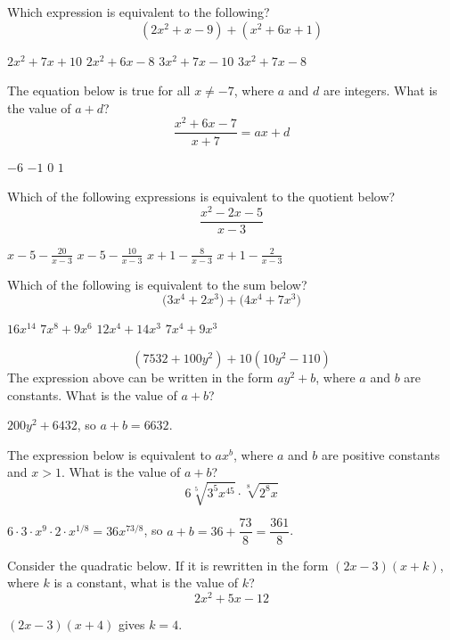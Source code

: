 \question[1]
Which expression is equivalent to the following?
\[
  \left(2 x^{2}+x-9\right)+\left(x^{2}+6 x+1\right)
\]
\begin{choices}
  \choice $2 x^{2}+7 x+10$
  \choice $2 x^{2}+6 x-8$
  \choice $3 x^{2}+7 x-10$
  \CorrectChoice $3 x^{2}+7 x-8$
\end{choices}


\newpage

\question[1]
The equation below is true for all $x \neq-7$, where $a$ and $d$ are integers. What is the value of $a+d$?
\[
  \frac{x^{2}+6 x-7}{x+7}=a x+d
\]
\begin{choices}
  \choice $-6$
  \choice $-1$
  \CorrectChoice $0$
  \choice $1$
\end{choices}

\question[1]
Which of the following expressions is equivalent to the quotient below?
\[
  \frac{x^{2}-2 x-5}{x-3}
\]
\begin{choices}
  \choice $\displaystyle x-5-\frac{20}{x-3}$
  \choice $\displaystyle x-5-\frac{10}{x-3}$
  \CorrectChoice $\displaystyle x+1-\frac{8}{x-3}$
  \choice $\displaystyle x+1-\frac{2}{x-3}$
\end{choices}

\question[1]
Which of the following is equivalent to the sum below?
\[
  \bigl(3 x^{4}+2 x^{3}\bigr)+\bigl(4 x^{4}+7 x^{3}\bigr)
\]
\begin{choices}
  \choice $16 x^{14}$
  \choice $7 x^{8}+9 x^{6}$
  \choice $12 x^{4}+14 x^{3}$
  \CorrectChoice $7 x^{4}+9 x^{3}$
\end{choices}

\newpage


\question[1]
\[
  \left(7532+100 y^{2}\right)+10\left(10 y^{2}-110\right)
\]
The expression above can be written in the form $a y^{2}+b$, where $a$ and $b$ are constants. What is the value of $a+b$?
\begin{solutionorbox}[1.25in]
  $200y^{2}+6432$, so $a+b=6632$.
\end{solutionorbox}

\question[1]
The expression below is equivalent to $a x^{b}$, where $a$ and $b$ are positive constants and $x>1$. What is the value of $a+b$?
\[
  6 \sqrt[5]{3^{5} x^{45}} \cdot \sqrt[8]{2^{8} x}
\]
\begin{solutionorbox}[1.25in]
  $6\cdot 3\cdot x^{9}\cdot 2\cdot x^{1/8}=36x^{73/8}$, so $a+b=36+\dfrac{73}{8}=\dfrac{361}{8}$.
\end{solutionorbox}

\question[1]
Consider the quadratic below. If it is rewritten in the form $(2 x-3)(x+k)$, where $k$ is a constant, what is the value of $k$?
\[
  2 x^{2}+5 x-12
\]
\begin{solutionorbox}[1in]
  $(2x-3)(x+4)$ gives $k=4$.
\end{solutionorbox}

